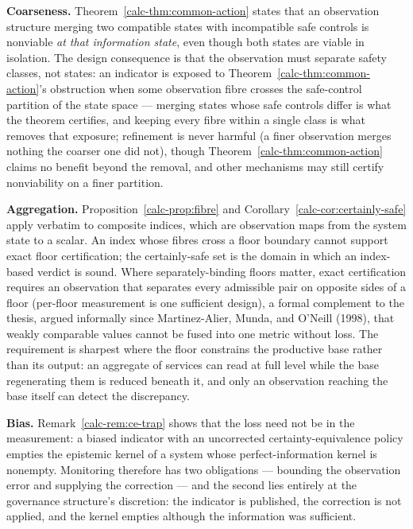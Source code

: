 \documentclass[10pt,twocolumn]{article}
\theoremstyle{definition}
\begin{document}
\textbf{Coarseness.} Theorem~\ref{calc-thm:common-action} states that an observation structure
merging two compatible states with incompatible safe controls is
nonviable \emph{at that information state}, even though both states are
viable in isolation. The design consequence is that the observation must
separate safety classes, not states: an indicator is exposed to Theorem~\ref{calc-thm:common-action}'s obstruction when some observation fibre crosses the safe-control
partition of the state space --- merging states whose safe controls differ is what the theorem certifies, and keeping every fibre within a single class is what removes that exposure; refinement is never harmful (a finer observation merges nothing the coarser one did not), though Theorem~\ref{calc-thm:common-action}
claims no benefit beyond the removal, and other mechanisms may still
certify nonviability on a finer partition.

\textbf{Aggregation.} Proposition~\ref{calc-prop:fibre} and Corollary~\ref{calc-cor:certainly-safe} apply verbatim to
composite indices, which are observation maps from the system state to a
scalar. An index whose fibres cross a floor boundary cannot support
exact floor certification; the certainly-safe set is the domain in which an index-based verdict is sound. Where separately-binding floors matter, exact
certification requires an observation that separates every admissible
pair on opposite sides of a floor (per-floor measurement is one sufficient design), a formal complement to the thesis, argued informally since Martinez-Alier, Munda, and O'Neill (1998), that weakly comparable
values cannot be fused into one metric without loss. The requirement is
sharpest where the floor constrains the productive base rather than its
output: an aggregate of services can read at full level while the base
regenerating them is reduced beneath it, and only an observation
reaching the base itself can detect the discrepancy.

\textbf{Bias.} Remark~\ref{calc-rem:ce-trap} shows that the loss need not be in the
measurement: a biased indicator with an uncorrected
certainty-equivalence policy empties the epistemic kernel of a system
whose perfect-information kernel is nonempty. Monitoring therefore has
two obligations --- bounding the observation error and supplying the
correction --- and the second lies entirely at the governance structure's discretion: the indicator is published, the correction is not applied,
and the kernel empties although the information was sufficient.
\end{document}
